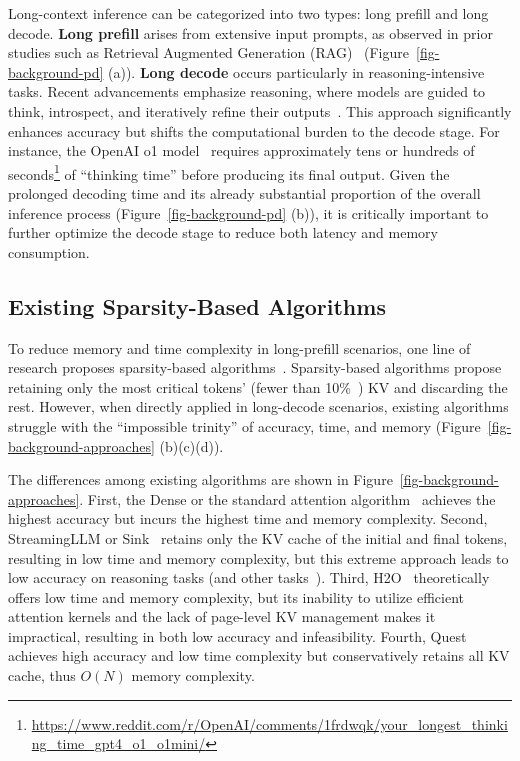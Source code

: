 Long-context inference can be categorized into two types: long prefill and long decode. \textbf{Long prefill} arises from extensive input prompts, as observed in prior studies such as Retrieval Augmented Generation (RAG)~\cite{li2022survey,jin2024ragcache,gao2023retrieval,jeong2024adaptive,ram2023context,mao2020generation} (Figure~\ref{fig-background-pd} (a)). \textbf{Long decode} occurs particularly in reasoning-intensive tasks. Recent advancements emphasize reasoning, where models are guided to think, introspect, and iteratively refine their outputs~\cite{openai2024o1, wang2024openr, lightman2023let, zhao2024marco, wei2022chain}. This approach significantly enhances accuracy but shifts the computational burden to the decode stage. For instance, the OpenAI o1 model~\cite{openai2024o1} requires approximately tens or hundreds of seconds\footnote{\url{https://www.reddit.com/r/OpenAI/comments/1frdwqk/your_longest_thinking_time_gpt4_o1_o1mini/}} of ``thinking time'' before producing its final output. Given the prolonged decoding time and its already substantial proportion of the overall inference process (Figure~\ref{fig-background-pd} (b)), it is critically important to further optimize the decode stage to reduce both latency and memory consumption.


\subsection{Existing Sparsity-Based Algorithms}



To reduce memory and time complexity in long-prefill scenarios, one line of research proposes sparsity-based algorithms~\cite{xiao2023sink, zhang2023h2o, tang2024quest, chenarkvale}. Sparsity-based algorithms propose retaining only the most critical tokens' (fewer than 10\%~\cite{tang2024quest}) KV and discarding the rest. However, when directly applied in long-decode scenarios, existing algorithms struggle with the ``impossible trinity'' of accuracy, time, and memory (Figure~\ref{fig-background-approaches} (b)(c)(d)).

The differences among existing algorithms are shown in Figure~\ref{fig-background-approaches}. First, the Dense or the standard attention algorithm~\cite{vaswani2017attention} achieves the highest accuracy but incurs the highest time and memory complexity. Second, StreamingLLM or Sink~\cite{xiao2023sink} retains only the KV cache of the initial and final tokens, resulting in low time and memory complexity, but this extreme approach leads to low accuracy on reasoning tasks (and other tasks~\cite{tang2024quest}). Third, H2O~\cite{zhang2023h2o} theoretically offers low time and memory complexity, but its inability to utilize efficient attention kernels and the lack of page-level KV management makes it impractical, resulting in both low accuracy and infeasibility. Fourth, Quest achieves high accuracy and low time complexity but conservatively retains all KV cache, thus $O(N)$ memory complexity.




